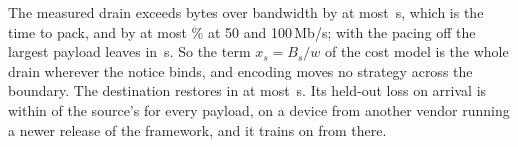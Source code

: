 The measured drain exceeds bytes over bandwidth by at most \linkOverMax\,s, which is the time to pack, and by at most
\linkOverPct\% at 50 and 100\,Mb/s; with the pacing off the largest payload leaves in \linkLFullLoop\,s. So the term $x_s = B_s/w$ of the cost model
is the whole drain wherever the notice binds, and encoding moves no strategy across the boundary. The destination
restores in at most \linkRestoreMax\,s. Its held-out loss on arrival is within \linkArriveMax\mnats{} of the source's
for every payload, on a device from another vendor running a newer release of the framework, and it trains on from
there.
